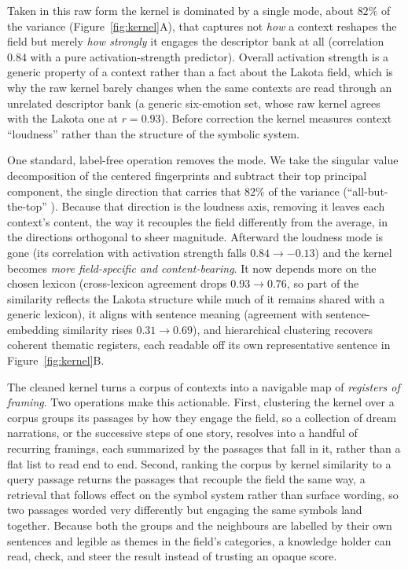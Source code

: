 \documentclass[final,creativeai]{article}
\begin{document}
Taken in this raw form the kernel is dominated by a single mode, about $82\%$ of the variance (Figure~\ref{fig:kernel}A), that captures not \emph{how} a context reshapes the field but merely \emph{how strongly} it engages the descriptor bank at all (correlation $0.84$ with a pure activation-strength predictor). Overall activation strength is a generic property of a context rather than a fact about the Lakota field, which is why the raw kernel barely changes when the same contexts are read through an unrelated descriptor bank (a generic six-emotion set, whose raw kernel agrees with the Lakota one at $r=0.93$). Before correction the kernel measures context ``loudness'' rather than the structure of the symbolic system.

One standard, label-free operation removes the mode. We take the singular value decomposition of the centered fingerprints and subtract their top principal component, the single direction that carries that $82\%$ of the variance (``all-but-the-top'' \citep{mu_allbutthetop_2018}). Because that direction is the loudness axis, removing it leaves each context's content, the way it recouples the field differently from the average, in the directions orthogonal to sheer magnitude. Afterward the loudness mode is gone (its correlation with activation strength falls $0.84 \to -0.13$) and the kernel becomes \emph{more field-specific and content-bearing}. It now depends more on the chosen lexicon (cross-lexicon agreement drops $0.93 \to 0.76$, so part of the similarity reflects the Lakota structure while much of it remains shared with a generic lexicon), it aligns with sentence meaning (agreement with sentence-embedding similarity rises $0.31 \to 0.69$), and hierarchical clustering recovers coherent thematic registers, each readable off its own representative sentence in Figure~\ref{fig:kernel}B.

The cleaned kernel turns a corpus of contexts into a navigable map of \emph{registers of framing}. Two operations make this actionable. First, clustering the kernel over a corpus groups its passages by how they engage the field, so a collection of dream narrations, or the successive steps of one story, resolves into a handful of recurring framings, each summarized by the passages that fall in it, rather than a flat list to read end to end. Second, ranking the corpus by kernel similarity to a query passage returns the passages that recouple the field the same way, a retrieval that follows effect on the symbol system rather than surface wording, so two passages worded very differently but engaging the same symbols land together. Because both the groups and the neighbours are labelled by their own sentences and legible as themes in the field's categories, a knowledge holder can read, check, and steer the result instead of trusting an opaque score.
\end{document}
